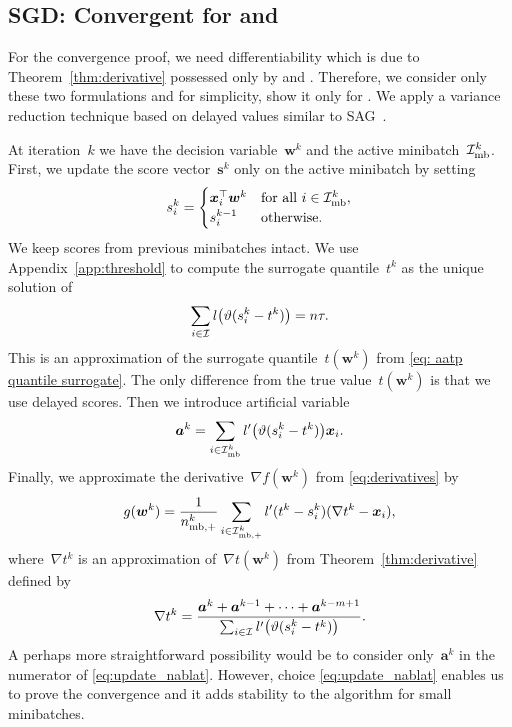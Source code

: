 \subsection{SGD: Convergent for \PatMat and \PatMatNP}

For the convergence proof, we need differentiability which is due to Theorem~\ref{thm:derivative} possessed only by \PatMat and \PatMatNP. Therefore, we consider only these two formulations and for simplicity, show it only for \PatMat. We apply a variance reduction technique based on delayed values similar to SAG~\cite{schmidt2017minimizing}. 

At iteration~$k$ we have the decision variable~$\bm{w}^k$ and the active minibatch~$\mathcal{I}_{\text{mb}}^k$. First, we update the score vector~$\bm{s}^k$ only on the active minibatch by setting
\begin{equation}\label{eq:defin_z}
  s_i^k = \begin{cases}
    \bm{x}_i^\top \bm{w}^k & \text{for all } i \in \mathcal{I}_{\text{mb}}^k, \\
    s_i^{k-1} & \text{otherwise.}
  \end{cases} 
\end{equation}
We keep scores from previous minibatches intact. We use Appendix~\ref{app:threshold} to compute the surrogate quantile~$t^k$ as the unique solution of
\begin{equation}\label{eq:update_t}
  \sum_{i \in \I}l\Brac{\vartheta(s_i^k - t^k)} = n\tau.
\end{equation}
This is an approximation of the surrogate quantile~$t(\bm{w}^k)$ from \eqref{eq: aatp quantile surrogate}. The only difference from the true value~$t(\bm{w}^k)$ is that we use delayed scores. Then we introduce artificial variable
\begin{equation}\label{eq:update_a}
  \bm{a}^k = \sum_{i \in \Imb^k} l'\Brac{\vartheta(s_i^k - t^k)}\bm{x}_i.
\end{equation}
Finally, we approximate the derivative~$\nabla f(\bm{w}^k)$ from \eqref{eq:derivatives} by
\begin{equation}\label{eq:update_g}
  g(\bm{w}^k) = \frac{1}{n_{\text{mb},+}^k} \sum_{i \in \mathcal{I}_{\text{mb},+}^k} l'(t^k - s_i^k)(\nabla t^k - \bm{x}_i),
\end{equation}
where~$\nabla t^k$ is an approximation of~$\nabla t(\bm{w}^k)$ from Theorem~\ref{thm:derivative} defined by
\begin{equation}\label{eq:update_nablat}
  \nabla t^k
    = \frac{\bm{a}^k + \bm{a}^{k-1} + \dots + \bm{a}^{k - m + 1}}{\sum_{i \in \I} l'\Brac{\vartheta(s_i^k - t^k)}}.
\end{equation}
A perhaps more straightforward possibility would be to consider only~$\bm{a}^k$ in the numerator of \eqref{eq:update_nablat}. However, choice \eqref{eq:update_nablat} enables us to prove the convergence and it adds stability to the algorithm for small minibatches.

